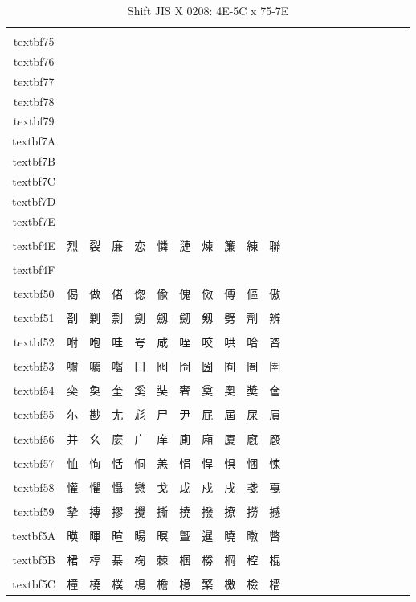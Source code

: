 \begin{table}[H]
\centering
\caption{Shift JIS X 0208: 4E-5C x 75-7E}
\begin{tabular}{|Sc|Sc|Sc|Sc|Sc|Sc|Sc|Sc|Sc|Sc|Sc|}
\hline
 & \\textbf{75} & \\textbf{76} & \\textbf{77} & \\textbf{78} & \\textbf{79} & \\textbf{7A} & \\textbf{7B} & \\textbf{7C} & \\textbf{7D} & \\textbf{7E} \\ \hline
\\textbf{4E} & 烈 & 裂 & 廉 & 恋 & 憐 & 漣 & 煉 & 簾 & 練 & 聯 \\ \hline
\\textbf{4F} &  &  &  &  &  &  &  &  &  &  \\ \hline
\\textbf{50} & 偈 & 做 & 偖 & 偬 & 偸 & 傀 & 傚 & 傅 & 傴 & 傲 \\ \hline
\\textbf{51} & 剳 & 剿 & 剽 & 劍 & 劔 & 劒 & 剱 & 劈 & 劑 & 辨 \\ \hline
\\textbf{52} & 咐 & 咆 & 哇 & 咢 & 咸 & 咥 & 咬 & 哄 & 哈 & 咨 \\ \hline
\\textbf{53} & 囎 & 囑 & 囓 & 囗 & 囮 & 囹 & 圀 & 囿 & 圄 & 圉 \\ \hline
\\textbf{54} & 奕 & 奐 & 奎 & 奚 & 奘 & 奢 & 奠 & 奧 & 奬 & 奩 \\ \hline
\\textbf{55} & 尓 & 尠 & 尢 & 尨 & 尸 & 尹 & 屁 & 屆 & 屎 & 屓 \\ \hline
\\textbf{56} & 并 & 幺 & 麼 & 广 & 庠 & 廁 & 廂 & 廈 & 廐 & 廏 \\ \hline
\\textbf{57} & 恤 & 恂 & 恬 & 恫 & 恙 & 悁 & 悍 & 惧 & 悃 & 悚 \\ \hline
\\textbf{58} & 懽 & 懼 & 懾 & 戀 & 戈 & 戉 & 戍 & 戌 & 戔 & 戛 \\ \hline
\\textbf{59} & 摯 & 摶 & 摎 & 攪 & 撕 & 撓 & 撥 & 撩 & 撈 & 撼 \\ \hline
\\textbf{5A} & 暎 & 暉 & 暄 & 暘 & 暝 & 曁 & 暹 & 曉 & 暾 & 暼 \\ \hline
\\textbf{5B} & 桾 & 椁 & 棊 & 椈 & 棘 & 椢 & 椦 & 棡 & 椌 & 棍 \\ \hline
\\textbf{5C} & 橦 & 橈 & 樸 & 樢 & 檐 & 檍 & 檠 & 檄 & 檢 & 檣 \\ \hline
\end{tabular}
\end{table}


